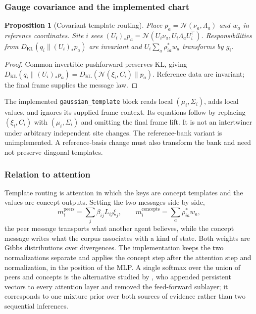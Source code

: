 \documentclass[11pt]{article}
\newtheorem{proposition}[theorem]{Proposition}
\theoremstyle{definition}
\theoremstyle{remark}
\providecommand{\cfg}[1]{{\small\texttt{#1}}}
\providecommand{\KL}{D_{\mathrm{KL}}}
\providecommand{\N}{\mathcal{N}}
\begin{document}
\subsubsection{Gauge covariance and the implemented chart}
\begin{proposition}[Covariant template routing]
\label{inference:t:prop:covariant}
Place $p_a=\N(\nu_a,\Lambda_a)$ and $w_a$ in reference coordinates. Site $i$ sees $(U_i)_*p_a=\N(U_i\nu_a,U_i\Lambda_aU_i^\top)$. Responsibilities from $\KL(q_i\|(U_i)_*p_a)$ are invariant and $U_i\sum_a\rho_{ia}^*w_a$ transforms by $g_i$.
\end{proposition}
\begin{proof}
Common invertible pushforward preserves KL, giving $\KL(q_i\|(U_i)_*p_a)=\KL(\N(\xi_i,C_i)\|p_a)$. Reference data are invariant; the final frame supplies the message law.
\end{proof}
The implemented \cfg{gaussian\_template} block reads local $(\mu_i,\Sigma_i)$, adds local values, and ignores its supplied frame context. Its equations follow by replacing $(\xi_i,C_i)$ with $(\mu_i,\Sigma_i)$ and omitting the final frame lift. It is not an intertwiner under arbitrary independent site changes. The reference-bank variant is unimplemented. A reference-basis change must also transform the bank and need not preserve diagonal templates.


\subsubsection{Relation to attention}

Template routing is attention in which the keys are concept templates and the values are concept outputs. Setting the two messages side by side,
\begin{equation}
m_i^{\mathrm{peers}}=\sum_j\beta_{ij}L_{ij}\xi_j,
\qquad
m_i^{\mathrm{concepts}}=\sum_a\rho^{*}_{ia}w_a,
\end{equation}
the peer message transports what another agent believes, while the concept message writes what the corpus associates with a kind of state. Both weights are Gibbs distributions over divergences. The implementation keeps the two normalizations separate and applies the concept step after the attention step and normalization, in the position of the MLP. A single softmax over the union of peers and concepts is the alternative studied by \citep{inference:sukhbaatar2019}, who appended persistent vectors to every attention layer and removed the feed-forward sublayer; it corresponds to one mixture prior over both sources of evidence rather than two sequential inferences.
\end{document}

